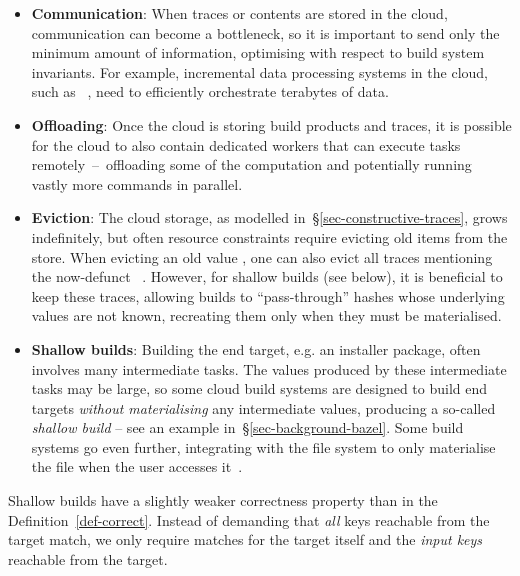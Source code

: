 \begin{itemize}
\item \textbf{Communication}: When traces or contents are stored in the cloud,
communication can become a bottleneck, so it is important to send only the
minimum amount of information, optimising with respect to build system
invariants. For example, incremental data processing systems in the cloud, such
as \Reflow~\cite{reflow}, need to efficiently orchestrate terabytes of data.

\item \textbf{Offloading}: Once the cloud is storing build products and traces,
it is possible for the cloud to also contain dedicated workers that can execute
tasks remotely~--~offloading some of the computation and potentially running
vastly more commands in parallel.

\item \textbf{Eviction}: The cloud storage, as modelled
in~\S\ref{sec-constructive-traces}, grows indefinitely, but often resource
constraints require evicting old items from the store. When evicting an old
value , one can also evict all traces mentioning the now-defunct
~. However, for shallow builds (see below), it is beneficial to
keep these traces, allowing builds to ``pass-through'' hashes whose underlying
values are not known, recreating them only when they must be materialised.

\item \textbf{Shallow builds}: Building the end target, e.g. an installer
package, often involves many intermediate tasks. The values produced by these
intermediate tasks may be large, so some cloud build systems are designed to
build end targets \emph{without materialising} any intermediate values,
producing a so-called \emph{shallow build} -- see an example
in~\S\ref{sec-background-bazel}. Some build systems go even further, integrating
with the file system to only materialise the file when the user accesses
it~\cite{gvfs}.
\end{itemize}

Shallow builds have a slightly weaker correctness property than in the
Definition~\ref{def-correct}. Instead of demanding that \emph{all} keys reachable
from the target match, we only require matches for the target itself and the
\emph{input keys} reachable from the target.

